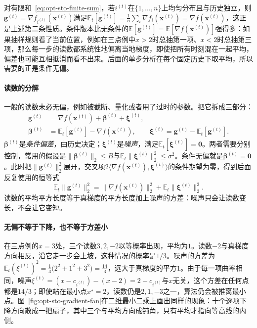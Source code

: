 对有限和~\eqref{eq:opt-sto-finite-sum}，若$i^{(t)}$在$\{1,\dots,n\}$上均匀分布且与历史独立，则$\bm g^{(t)}=\nabla f_{i^{(t)}}(\bm x^{(t)})$满足$\mathbb E_t[\bm g^{(t)}]=\frac1n\sum_i\nabla f_i(\bm x^{(t)})=\nabla f(\bm x^{(t)})$，这正是上述第二条性质。条件版本比无条件的$\mathbb E[\bm g^{(t)}]=\mathbb E[\nabla f(\bm x^{(t)})]$强得多：如果抽样规则看了当前位置，例如在三点例中$x>2$时总抽第一项、$x<2$时总抽第三项，那么每一步的读数都系统性地偏离当地梯度，即使把所有时刻混在一起平均，偏差也可能互相抵消而看不出来。后面的单步分析在每个固定历史下取平均，所以需要的正是条件无偏。

\paragraph{读数的分解}
一般的读数未必无偏，例如被截断、量化或者用了过时的参数。把它拆成三部分：
\begin{equation}
\label{eq:opt-sto-reading-split}
\begin{aligned}
  \bm g^{(t)}&=\nabla f(\bm x^{(t)})+\bm\beta^{(t)}+\bm\xi^{(t)},\\
  \bm\beta^{(t)}&=\mathbb E_t[\bm g^{(t)}]-\nabla f(\bm x^{(t)}),\qquad
  \bm\xi^{(t)}=\bm g^{(t)}-\mathbb E_t[\bm g^{(t)}].
\end{aligned}
\end{equation}
$\bm\beta^{(t)}$是\emph{条件偏差}，由历史决定；$\bm\xi^{(t)}$是\emph{噪声}，满足$\mathbb E_t[\bm\xi^{(t)}]=\bm0$。两者需要分别控制，常用的假设是$\lVert\bm\beta^{(t)}\rVert_2\leq B$与$\mathbb E_t\lVert\bm\xi^{(t)}\rVert_2^2\leq\sigma^2$。条件无偏就是$\bm\beta^{(t)}=\bm0$。此时把$\lVert\bm g^{(t)}\rVert_2^2$展开，交叉项$2\langle\nabla f(\bm x^{(t)}),\bm\xi^{(t)}\rangle$的条件期望为零，得到后面反复使用的恒等式
\begin{equation}
\label{eq:opt-sto-second-moment}
  \mathbb E_t\lVert\bm g^{(t)}\rVert_2^2=\lVert\nabla f(\bm x^{(t)})\rVert_2^2+\mathbb E_t\lVert\bm\xi^{(t)}\rVert_2^2 .
\end{equation}
读数的平均平方长度等于真梯度的平方长度加上噪声的方差：噪声只会让读数变长，不会让它变短。

\paragraph{无偏不等于下降，也不等于方差小}
在三点例的$x=3$处，三个读数$3,2,-2$以等概率出现，平均为$1$。读数$-2$与真梯度方向相反，沿它走一步会上坡，这种情况的概率是$1/3$。噪声的方差为$\mathbb E_t(\xi^{(t)})^2=\frac13\bigl(2^2+1^2+3^2\bigr)=\frac{14}3$，远大于真梯度的平方$1$。由于每一项曲率相同，噪声$\xi^{(t)}=(x-c_{i^{(t)}})-(x-2)=2-c_{i^{(t)}}$与$x$无关，这个方差在任何点都是$14/3$；即使站在最小点$x^\star=2$，读数仍是$2,1,-3$之一，算法仍会被推离最小点。图~\ref{fig:opt-sto-gradient-fan}在二维最小二乘上画出同样的现象：十个逐项下降方向散成一把扇子，其中三个与平均方向成钝角，只有平均才指向等高线的内侧。

